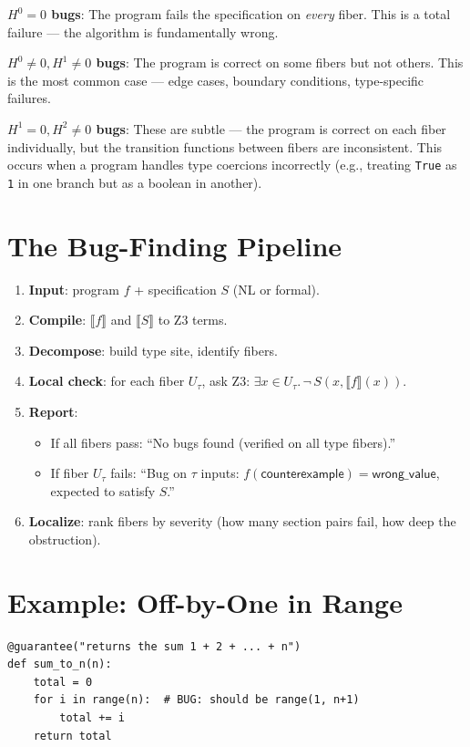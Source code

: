 \documentclass[11pt,a4paper]{report}
\theoremstyle{definition}
\theoremstyle{plain}
\newcommand{\den}[1]{\llbracket #1 \rrbracket}
\newcommand{\Hzero}{H^0}
\newcommand{\Hone}{H^1}
\newcommand{\Htwo}{H^2}
\begin{document}
\textbf{$\Hzero = 0$ bugs}: The program fails the specification on
\emph{every} fiber.  This is a total failure --- the algorithm is
fundamentally wrong.

\textbf{$\Hzero \neq 0, \Hone \neq 0$ bugs}: The program is correct
on some fibers but not others.  This is the most common case ---
edge cases, boundary conditions, type-specific failures.

\textbf{$\Hone = 0, \Htwo \neq 0$ bugs}: These are subtle --- the
program is correct on each fiber individually, but the transition
functions between fibers are inconsistent.  This occurs when a
program handles type coercions incorrectly (e.g., treating
\texttt{True} as \texttt{1} in one branch but as a boolean in
another).

\section{The Bug-Finding Pipeline}

\begin{enumerate}
  \item \textbf{Input}: program $f$ + specification $S$ (NL or formal).
  \item \textbf{Compile}: $\den{f}$ and $\den{S}$ to Z3 terms.
  \item \textbf{Decompose}: build type site, identify fibers.
  \item \textbf{Local check}: for each fiber $U_\tau$, ask Z3:
    $\exists x \in U_\tau.\, \lnot\,S(x, \den{f}(x))$.
  \item \textbf{Report}:
    \begin{itemize}
      \item If all fibers pass: ``No bugs found (verified on all
        type fibers).''
      \item If fiber $U_\tau$ fails: ``Bug on $\tau$ inputs:
        $f(\mathsf{counterexample}) = \mathsf{wrong\_value}$,
        expected to satisfy $S$.''
    \end{itemize}
  \item \textbf{Localize}: rank fibers by severity (how many section
    pairs fail, how deep the obstruction).
\end{enumerate}

\section{Example: Off-by-One in Range}

\begin{lstlisting}[caption={Sum with off-by-one}]
@guarantee("returns the sum 1 + 2 + ... + n")
def sum_to_n(n):
    total = 0
    for i in range(n):  # BUG: should be range(1, n+1)
        total += i
    return total
\end{lstlisting}
\end{document}
